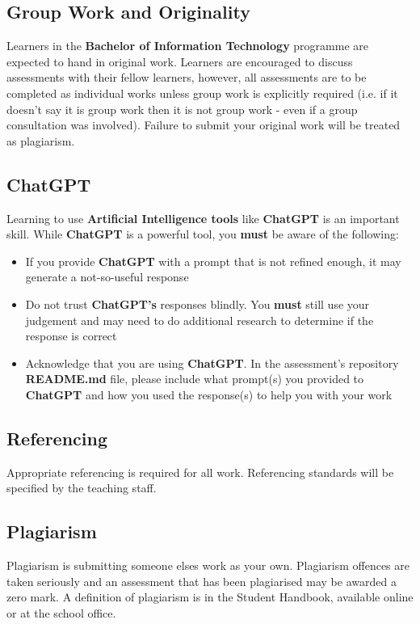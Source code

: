 \documentclass{article}
\begin{document}
\subsection*{Group Work and Originality}
Learners in the \textbf{Bachelor of Information Technology} programme are expected to hand in original work. Learners are encouraged to discuss assessments with their fellow learners, however, all assessments are to be completed as individual works unless group work is explicitly required (i.e. if it doesn't say it is group work then it is not group work - even if a group consultation was involved). Failure to submit your original work will be treated as plagiarism.

\subsection*{ChatGPT}
Learning to use \textbf{Artificial Intelligence tools} like \textbf{ChatGPT} is an important skill. While \textbf{ChatGPT} is a powerful tool, you \textbf{must} be aware of the following:

\begin{itemize}
    \item If you provide \textbf{ChatGPT} with a prompt that is not refined enough, it may generate a not-so-useful response
    \item Do not trust \textbf{ChatGPT's} responses blindly. You \textbf{must} still use your judgement and may need to do additional research to determine if the response is correct
    \item Acknowledge that you are using \textbf{ChatGPT}. In the assessment's repository \textbf{README.md} file, please include what prompt(s) you provided to \textbf{ChatGPT} and how you used the response(s) to help you with your work
\end{itemize}

\subsection*{Referencing}
Appropriate referencing is required for all work. Referencing standards will be specified by the teaching staff.

\subsection*{Plagiarism}
Plagiarism is submitting someone elses work as your own. Plagiarism offences are taken seriously and an assessment that has been plagiarised may be awarded a zero mark. A definition of plagiarism is in the Student Handbook, available online or at the school office.
\end{document}

